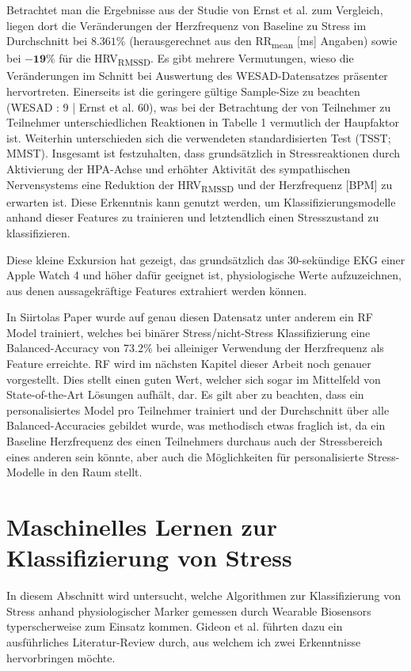 Betrachtet man die Ergebnisse aus der Studie von Ernst et al. \cite{Ernst2023} zum Vergleich, liegen dort die Veränderungen der Herzfrequenz von Baseline zu Stress im Durchschnitt bei $\mathbf{8.361\%}$ (herausgerechnet aus den RR\textsubscript{mean} [ms] Angaben) sowie bei 
$\mathbf{-19\%}$ für die HRV\textsubscript{RMSSD}. Es gibt mehrere Vermutungen, wieso die Veränderungen im Schnitt bei Auswertung des WESAD-Datensatzes präsenter hervortreten. Einerseits ist die geringere gültige Sample-Size zu beachten (WESAD : 9 | Ernst et al. 60), was bei der Betrachtung der 
von Teilnehmer zu Teilnehmer unterschiedlichen Reaktionen in Tabelle 1 vermutlich der Haupfaktor ist. Weiterhin unterschieden sich die verwendeten standardisierten Test (\ac{TSST}; \ac{MMST}). Insgesamt ist festzuhalten, dass grundsätzlich in Stressreaktionen durch Aktivierung der \ac{HPA-Achse} und erhöhter
Aktivität des sympathischen Nervensystems eine Reduktion der HRV\textsubscript{RMSSD} und der Herzfrequenz [BPM] zu erwarten ist. Diese Erkenntnis kann genutzt werden, um Klassifizierungsmodelle anhand dieser Features zu trainieren und letztendlich einen Stresszustand zu klassifizieren.

Diese kleine Exkursion hat gezeigt, das grundsätzlich das 30-sekündige \ac{EKG} einer Apple Watch 4 und höher dafür geeignet ist, physiologische Werte aufzuzeichnen, aus denen aussagekräftige Features extrahiert werden können.

In Siirtolas Paper wurde auf genau diesen Datensatz unter anderem ein \ac{RF} Model trainiert, welches bei binärer Stress/nicht-Stress Klassifizierung eine Balanced-Accuracy von 73.2\% bei alleiniger Verwendung der Herzfrequenz als Feature erreichte. \cite{Siirtola2019}
\ac{RF} wird im nächsten Kapitel dieser Arbeit noch genauer vorgestellt. Dies stellt einen guten Wert, welcher sich sogar im Mittelfeld von State-of-the-Art Lösungen aufhält, dar. Es gilt aber zu beachten, dass ein personalisiertes Model pro Teilnehmer trainiert und der Durchschnitt über alle Balanced-Accuracies gebildet wurde, was methodisch etwas fraglich ist, da ein Baseline Herzfrequenz des einen Teilnehmers
durchaus auch der Stressbereich eines anderen sein könnte, aber auch die Möglichkeiten für personalisierte Stress-Modelle in den Raum stellt.

\section{Maschinelles Lernen zur Klassifizierung von Stress}
In diesem Abschnitt wird untersucht, welche Algorithmen zur Klassifizierung von Stress anhand physiologischer Marker gemessen durch Wearable Biosensors typerscherweise zum Einsatz kommen. 
Gideon et al. führten dazu ein ausführliches Literatur-Review durch, aus welchem ich zwei Erkenntnisse hervorbringen möchte. 

